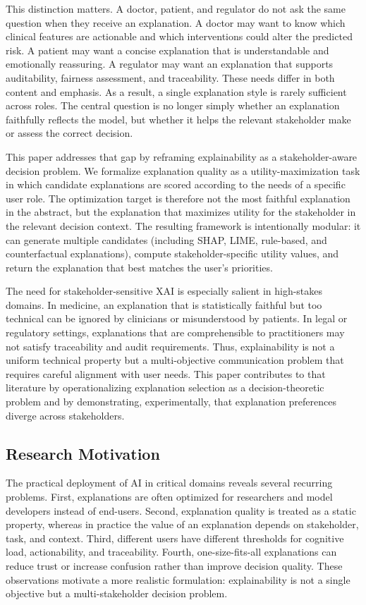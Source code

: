 \documentclass{article}
\begin{document}
This distinction matters. A doctor, patient, and regulator do not ask the same question when they receive an explanation. A doctor may want to know which clinical features are actionable and which interventions could alter the predicted risk. A patient may want a concise explanation that is understandable and emotionally reassuring. A regulator may want an explanation that supports auditability, fairness assessment, and traceability. These needs differ in both content and emphasis. As a result, a single explanation style is rarely sufficient across roles. The central question is no longer simply whether an explanation faithfully reflects the model, but whether it helps the relevant stakeholder make or assess the correct decision.

This paper addresses that gap by reframing explainability as a stakeholder-aware decision problem. We formalize explanation quality as a utility-maximization task in which candidate explanations are scored according to the needs of a specific user role. The optimization target is therefore not the most faithful explanation in the abstract, but the explanation that maximizes utility for the stakeholder in the relevant decision context. The resulting framework is intentionally modular: it can generate multiple candidates (including SHAP, LIME, rule-based, and counterfactual explanations), compute stakeholder-specific utility values, and return the explanation that best matches the user's priorities.

The need for stakeholder-sensitive XAI is especially salient in high-stakes domains. In medicine, an explanation that is statistically faithful but too technical can be ignored by clinicians or misunderstood by patients. In legal or regulatory settings, explanations that are comprehensible to practitioners may not satisfy traceability and audit requirements. Thus, explainability is not a uniform technical property but a multi-objective communication problem that requires careful alignment with user needs. This paper contributes to that literature by operationalizing explanation selection as a decision-theoretic problem and by demonstrating, experimentally, that explanation preferences diverge across stakeholders.

\subsection{Research Motivation}

The practical deployment of AI in critical domains reveals several recurring problems. First, explanations are often optimized for researchers and model developers instead of end-users. Second, explanation quality is treated as a static property, whereas in practice the value of an explanation depends on stakeholder, task, and context. Third, different users have different thresholds for cognitive load, actionability, and traceability. Fourth, one-size-fits-all explanations can reduce trust or increase confusion rather than improve decision quality. These observations motivate a more realistic formulation: explainability is not a single objective but a multi-stakeholder decision problem.
\end{document}
